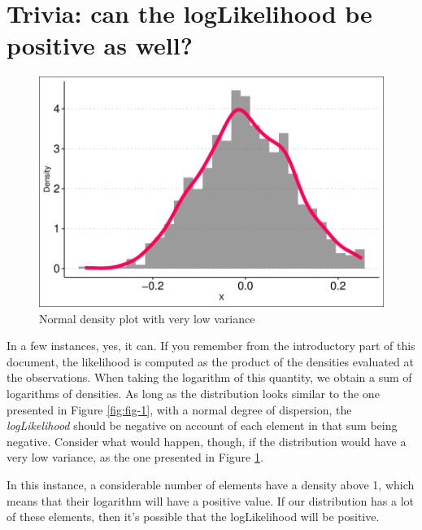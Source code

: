 \documentclass[12pt,english]{article}\usepackage[]{graphicx}\usepackage[usenames, dvipsnames]{xcolor}
\begin{document}
\section{Trivia: can the logLikelihood be positive as well?}




\begin{figure}[!ht]
\centering
\includegraphics[width=0.6\linewidth]{../../05-graphs/Supplem-02}
\caption[Normal density plot]{Normal density plot with very low variance}
\label{fig:fig-2}
\end{figure}

In a few instances, yes, it can. If you remember from the introductory part of this document, the likelihood is computed as the product of the densities evaluated at the observations. When taking the logarithm of this quantity, we obtain a sum of logarithms of densities. As long as the distribution looks similar to the one presented in Figure \ref{fig:fig-1}, with a normal degree of dispersion, the \textit{logLikelihood} should be negative on account of each element in that sum being negative. Consider what would happen, though, if the distribution would have a very low variance, as the one presented in Figure \ref{fig:fig-2}.

In this instance, a considerable number of elements have a density above 1, which means that their logarithm will have a positive value. If our distribution has a lot of these elements, then it's possible that the logLikelihood will be positive.


\end{document}
